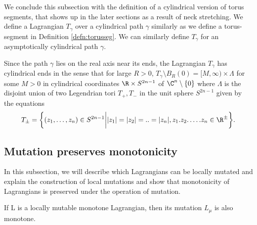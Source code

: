  
 
We conclude this subsection with the definition of a cylindrical version of  torus segments, that shows up in the later sections as a result of neck stretching. We define a Lagrangian $T_\gamma$ over a cylindrical path $\gamma$ similarly as we define a torus-segment in Definition \ref{defn:torusseg}. We can similarly define $T_\gamma$ for an asymptotically cylindrical path $\gamma$.

Since the path $\gamma$ lies on the real axis near its ends, the Lagrangian $T_\gamma$ has cylindrical ends in the sense that for large $R>0$, $T_\gamma \setminus B_R(0) =  [M,\infty) \times \Lambda $ for some $M>0$ in cylindrical coordinates $\R \times S^{2n-1} $ of $\C^n\setminus \{0\}$  where $\Lambda$ is the disjoint union of two Legendrian tori $T_+,T_-$ in the unit sphere $S^{2n-1}$ given by the equations 
\begin{equation} \label{def:tplusminus}
    T_\pm = \bigg \{ (z_1,\dots,z_n) \in S^{2n-1} \bigg | |z_1| = |z_2| = ..=|z_n| , z_1.z_2.\dots.z_n \in  \R^\pm  \bigg \} .
\end{equation}

\subsection{Mutation preserves monotonicity}
In this subsection, we will describe which Lagrangians can be locally mutated and explain the construction of local mutations and show that monotonicity of Lagrangians is preserved under the operation of mutation.





\begin{lemma}\label{mutmono}


If L is a locally mutable monotone Lagrangian, then its mutation $L_\mu$ is also monotone.
\end{lemma}

